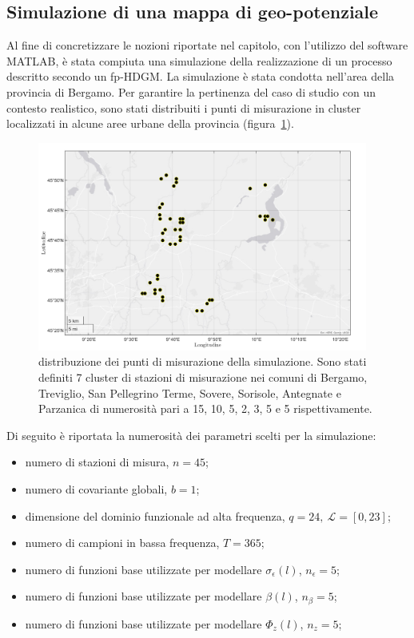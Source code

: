 \subsection[Simulazione di una mappa di geo-potenziale]{Simulazione di una mappa di geo-potenziale}
Al fine di concretizzare le nozioni riportate nel capitolo, con l'utilizzo del software MATLAB, è stata compiuta una simulazione della realizzazione di un processo descritto secondo un fp-HDGM. La simulazione è stata condotta nell'area della provincia di Bergamo. Per garantire la pertinenza del caso di studio con un contesto realistico, sono stati distribuiti i punti di misurazione in cluster localizzati in alcune aree urbane della provincia (figura~\ref{mappa_stazioni_simulate}). 
\begin{figure}[htp]
	\centering
	\includegraphics[height=260px]{Immagini/2. Nuovo modello/Mappa stazioni simulate_png}
	\caption[Distribuzione dei punti di misurazione della simulazione.] {distribuzione dei punti di misurazione della simulazione. Sono stati definiti 7 cluster di stazioni di misurazione nei comuni di Bergamo, Treviglio, San Pellegrino Terme, Sovere, Sorisole, Antegnate e Parzanica di numerosità pari a \num{15}, \num{10}, \num{5}, \num{2}, \num{3}, \num{5} e \num{5} rispettivamente.}
	\label{mappa_stazioni_simulate}
\end{figure}
Di seguito è riportata la numerosità dei parametri scelti per la simulazione:
\begin{itemize}
	\item numero di stazioni di misura, $n=45$;
	\item numero di covariante globali, $b=1$;                               
	\item dimensione del dominio funzionale ad alta frequenza, $q=24,\ \mathcal{L}=[0, 23]$;
	\item numero di campioni in bassa frequenza, $T=365$;
	\item numero di funzioni base utilizzate per modellare  $\sigma_\epsilon (l)$,  $n_\epsilon =5$;
	\item numero di funzioni base utilizzate per modellare $\beta(l)$, $n_\beta=5$;
	\item numero di funzioni base utilizzate per modellare $\Phi_z(l)$, $n_z=5$;
\end{itemize}
